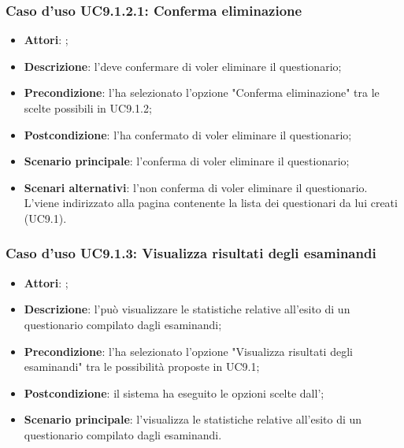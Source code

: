 				\subsubsection{Caso d'uso UC9.1.2.1: Conferma eliminazione}
				\label{UC9.1.2.1}
				\begin{itemize}
					\item \textbf{Attori}: \uaupro;
					\item \textbf{Descrizione}: l'\uaupro deve confermare di voler eliminare il questionario; 
					\item \textbf{Precondizione}: l'\uaupro ha selezionato l'opzione "Conferma eliminazione" tra le scelte possibili in UC9.1.2;
					\item \textbf{Postcondizione}: l'\uaupro ha confermato di voler eliminare il questionario;
					\item \textbf{Scenario principale}: l'\uaupro conferma di voler eliminare il questionario;
					\item \textbf{Scenari alternativi}: l'\uaupro non conferma di voler eliminare il questionario. L'\uaupro viene indirizzato alla pagina contenente la lista dei questionari da lui creati (UC9.1).
				\end{itemize}
								
		\subsubsection{Caso d'uso UC9.1.3: Visualizza risultati degli esaminandi}
		\label{UC9.1.3}
		\begin{itemize}
			\item \textbf{Attori}: \uaupro;
			\item \textbf{Descrizione}: l'\uaupro può visualizzare le statistiche relative all'esito di un  questionario compilato dagli esaminandi;
			\item \textbf{Precondizione}: l'\uaupro ha selezionato l'opzione "Visualizza risultati degli esaminandi" tra le possibilità proposte in UC9.1;
			\item \textbf{Postcondizione}: il sistema ha eseguito le opzioni scelte dall'\uaupro;
			\item \textbf{Scenario principale}: l'\uaupro visualizza le statistiche relative all'esito di un questionario compilato dagli esaminandi. 
		\end{itemize}
		

